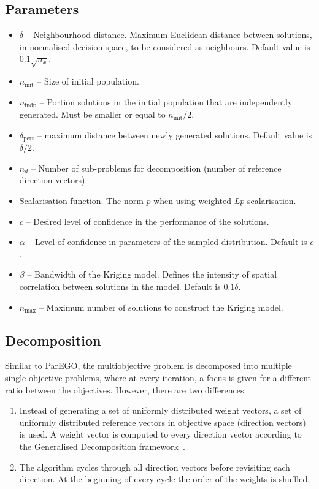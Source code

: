 \documentclass[10pt]{llncs}
\begin{document}
\subsection{Parameters}
\label{subsec:Parameters}
\begin{itemize}
\item $\delta$ -- Neighbourhood distance.
Maximum Euclidean distance between solutions, in normalised decision space, to be considered as neighbours.
Default value is $0.1 \sqrt{n_x}$.
\item $n_\text{init}$ -- Size of initial population.
\item $n_\text{indp}$ -- Portion solutions in the initial population that are independently generated.
Must be smaller or equal to $n_\text{init}/2$.
\item $\delta_\text{pert}$ -- maximum distance between newly generated solutions.
Default value is $\delta / 2$.
\item $n_d$ -- Number of sub-problems for decomposition (number of reference direction vectors).
\item Scalarisation function. The norm $p$ when using weighted $Lp$ scalarisation.
\item $c$ -- Desired level of confidence in the performance of the solutions.
\item $\alpha$ -- Level of confidence in parameters of the sampled distribution. Default is $c$.
\item $\beta$ -- Bandwidth of the Kriging model. Defines the intensity of spatial correlation between solutions in the model. Default is $0.1 \delta$.
\item $n_\text{max}$ -- Maximum number of solutions to construct the Kriging model.
\end{itemize}

\subsection{Decomposition}
\label{subsec:Simplex Lattice}

Similar to ParEGO, the multiobjective problem is decomposed into multiple single-objective problems, where at every iteration, a focus is given for a different ratio between the objectives.
However, there are two differences:
\begin{enumerate}
\item Instead of generating a set of uniformly distributed weight vectors, a set of uniformly distributed reference vectors in objective space (direction vectors) is used.
A weight vector is computed to every direction vector according to the Generalised Decomposition framework~\cite{giagkiozis2014generalized}.
\item The algorithm cycles through all direction vectors before revisiting each direction.
At the beginning of every cycle the order of the weights is shuffled.
\end{enumerate}
\end{document}
